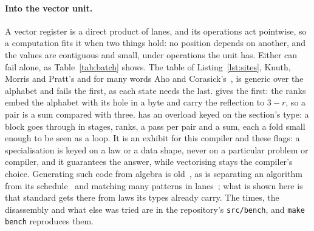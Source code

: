 \paragraph{Into the vector unit.}
A vector register is a direct product of lanes, and its operations act pointwise, so a computation fits it when two things hold: no position depends on another, and the values are contiguous and small, under operations the unit has.
Either can fail alone, as Table~\ref{tab:batch} shows.
The table of Listing~\ref{lst:sites}, Knuth, Morris and Pratt's and for many words Aho and Corasick's~\cite{aho1975efficient}, is generic over the alphabet and fails the first, as each state needs the last.
 gives the first: the ranks embed the alphabet with its hole in a byte and carry the reflection to $3 - r$, so a pair is a sum compared with three.
 has an overload keyed on the section's type: a block goes through in stages, ranks, a pass per pair and a sum, each a fold small enough to be seen as a loop.
It is an exhibit for this compiler and these flags: a specialisation is keyed on a law or a data shape, never on a particular problem or compiler, and it guarantees the answer, while vectorising stays the compiler's choice.
Generating such code from algebra is old~\cite{frigo2005fftw,puschel2005spiral}, as is separating an algorithm from its schedule~\cite{ragankelley2013halide} and matching many patterns in lanes~\cite{wang2019hyperscan}; what is shown here is that standard  gets there from laws its types already carry.
The times, the disassembly and what else was tried are in the repository's \texttt{src/bench}, and \texttt{make bench} reproduces them.

